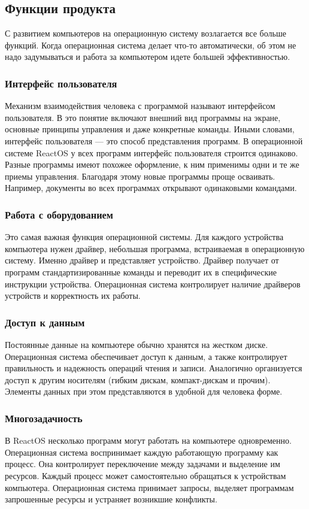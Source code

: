 \subsection{Функции продукта}
С развитием компьютеров на операционную систему возлагается все больше функций. Когда операционная система делает что-то автоматически, об этом не надо задумываться и работа за компьютером идете большей эффективностью.
\subsubsection{Интерфейс пользователя}
Механизм взаимодействия человека с программой называют интерфейсом пользователя. В это понятие включают внешний вид программы на экране, основные принципы управления и даже конкретные команды. Иными словами, интерфейс пользователя — это способ представления программ. В операционной системе ReactOS у всех программ интерфейс пользователя строится одинаково. Разные программы имеют похожее оформление, к ним применимы одни и те же приемы управления. Благодаря этому новые программы проще осваивать. Например, документы во всех программах открывают одинаковыми командами.
\subsubsection{Работа с оборудованием}
Это самая важная функция операционной системы. Для каждого устройства компьютера нужен драйвер, небольшая программа, встраиваемая в операционную систему. Именно драйвер и представляет устройство. Драйвер получает от программ стандартизированные команды и переводит их в специфические инструкции устройства. Операционная система контролирует наличие драйверов устройств и корректность их работы.
\subsubsection{Доступ к данным}
Постоянные данные на компьютере обычно хранятся на жестком диске. Операционная система обеспечивает доступ к данным, а также контролирует правильность и надежность операций чтения и записи. Аналогично организуется доступ к другим носителям (гибким дискам, компакт-дискам и прочим). Элементы данных при этом представляются в удобной для человека форме.
\subsubsection{Многозадачность}
В ReactOS несколько программ могут работать на компьютере одновременно. Операционная система воспринимает каждую работающую программу как процесс. Она контролирует переключение между задачами и выделение им ресурсов. Каждый процесс может самостоятельно обращаться к устройствам компьютера. Операционная система принимает запросы, выделяет программам запрошенные ресурсы и устраняет возникшие конфликты.
